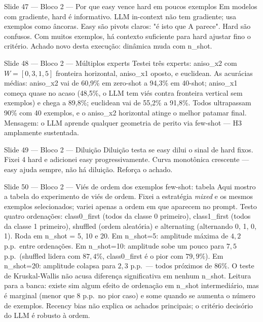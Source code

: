 \documentclass[aspectratio=169,10pt]{beamer}
\begin{document}
\begin{frame}{Slide 47 --- Bloco 2 --- Por que easy vence hard em poucos exemplos}
\footnotesize
Em modelos com gradiente, hard \'e informativo. LLM in-context n\~ao tem gradiente; usa exemplos como \^ancoras. Easy s\~ao pivots claros: "\'e isto que A parece". Hard s\~ao confusos. Com muitos exemplos, h\'a contexto suficiente para hard ajustar fino o crit\'erio. Achado novo desta execu\c{c}\~ao: din\^amica muda com n\_shot.
\end{frame}

\begin{frame}{Slide 48 --- Bloco 2 --- M\'ultiplos experts}
\footnotesize
Testei tr\^es experts: aniso\_x2 com $W=[0{,}3, 1{,}5]$ fronteira horizontal, aniso\_x1 oposto, e euclidean. As acur\'acias m\'edias: aniso\_x2 vai de 60,9\% em zero-shot a 94,3\% em 40-shot; aniso\_x1 come\c{c}a quase no acaso (48,5\%, o LLM tem vi\'es contra fronteira vertical sem exemplos) e chega a 89,8\%; euclidean vai de 55,2\% a 91,8\%. Todos ultrapassam 90\% com 40 exemplos, e o aniso\_x2 horizontal atinge o melhor patamar final. Mensagem: o LLM aprende qualquer geometria de perito via few-shot --- H3 amplamente sustentada.
\end{frame}

\begin{frame}{Slide 49 --- Bloco 2 --- Dilui\c{c}\~ao}
\footnotesize
Dilui\c{c}\~ao testa se easy dilui o sinal de hard fixos. Fixei 4 hard e adicionei easy progressivamente. Curva monot\^onica crescente --- easy ajuda sempre, n\~ao h\'a dilui\c{c}\~ao. Refor\c{c}a o achado.
\end{frame}

\begin{frame}{Slide 50 --- Bloco 2 --- Vi\'es de ordem dos exemplos few-shot: tabela}
\footnotesize
Aqui mostro a tabela do experimento de vi\'es de ordem. Fixei a estrat\'egia \emph{mixed} e os mesmos exemplos selecionados; variei apenas a ordem em que aparecem no prompt. Testo quatro ordena\c{c}\~oes: class0\_first (todos da classe 0 primeiro), class1\_first (todos da classe 1 primeiro), shuffled (ordem aleat\'oria) e alternating (alternando 0, 1, 0, 1). Roda em n\_shot = 5, 10 e 20. Em n\_shot=5: amplitude m\'axima de $4{,}2$ p.p.\ entre ordena\c{c}\~oes. Em n\_shot=10: amplitude sobe um pouco para $7{,}5$ p.p.\ (shuffled lidera com $87{,}4\%$, class0\_first \'e o pior com $79{,}9\%$). Em n\_shot=20: amplitude colapsa para $2{,}3$ p.p.\ --- todos pr\'oximos de $86\%$. O teste de Kruskal-Wallis n\~ao acusa diferen\c{c}a significativa em nenhum n\_shot. Leitura para a banca: existe sim algum efeito de ordena\c{c}\~ao em n\_shot intermedi\'ario, mas \'e marginal (menor que 8 p.p.\ no pior caso) e some quando se aumenta o n\'umero de exemplos. Recency bias n\~ao explica os achados principais; o crit\'erio decis\'orio do LLM \'e robusto \`a ordem.
\end{frame}
\end{document}
